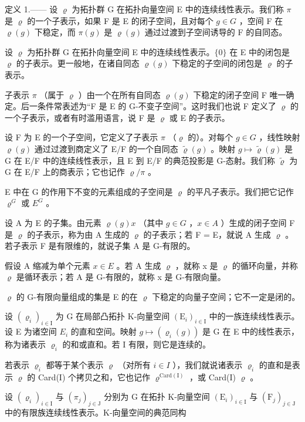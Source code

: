 定义 1.—— 设 \(\varrho\) 为拓扑群 G 在拓扑向量空间 E 中的连续线性表示。我们称 \(\pi\) 是 \(\varrho\) 的一个子表示，如果 F 是 E 的闭子空间，且对每个 \(g \in G\) ，空间 F 在 \(\varrho(g)\) 下稳定，而 \(\pi(g)\) 是 \(\varrho(g)\) 通过过渡到子空间诱导的 F 的自同态。

设 \(\varrho\) 为拓扑群 G 在拓扑向量空间 E 中的连续线性表示。\(\{0\}\) 在 E 中的闭包是 \(\varrho\) 的子表示。更一般地，在诸自同态 \(\varrho(g)\) 下稳定的子空间的闭包是 \(\varrho\) 的子表示。

子表示 \(\pi\) （属于 \(\varrho\) ）由一个在所有自同态 \(\varrho(g)\) 下稳定的闭子空间 F 唯一确定。后一条件常表述为“F 是 E 的 G-不变子空间”。这时我们也说 F 定义了 \(\varrho\) 的一个子表示，或者有时滥用语言，说 F 是 \(\varrho\) 或 E 的子表示。

设 F 为 E 的一个子空间，它定义了子表示 \(\pi\) （\(\varrho\) 的）。对每个 \(g \in G\) ，线性映射 \(\varrho(g)\) 通过过渡到商定义了 E/F 的一个自同态 \(\widetilde{\varrho}(g)\) 。映射 \(g \mapsto \widetilde{\varrho}(g)\) 是 G 在 E/F 中的连续线性表示，且 E 到 E/F 的典范投影是 G-态射。我们称 \(\widetilde{\varrho}\) 为 G 在 E/F 上的商表示；它也记作 \(\varrho/\pi\) 。

E 中在 G 的作用下不变的元素组成的子空间是 \(\varrho\) 的平凡子表示。我们把它记作 \(\varrho^{G}\) 或 \(E^{G}\) 。

设 A 为 E 的子集。由元素 \(\varrho(g)x\) （其中 \(g \in G\) ，\(x \in A\) ）生成的闭子空间 F 是 \(\varrho\) 的子表示，称为由 A 生成的 \(\varrho\) 的子表示；若 F = E，就说 A 生成 \(\varrho\) 。若子表示 F 是有限维的，就说子集 A 是 G-有限的。

假设 A 缩减为单个元素 \(x \in E\) 。若 A 生成 \(\varrho\) ，就称 x 是 \(\varrho\) 的循环向量，并称 \(\varrho\) 是循环表示；若 A 是 G-有限的，就称 x 是 G-有限向量。

\(\varrho\) 的 G-有限向量组成的集是 E 的在 \(\varrho\) 下稳定的向量子空间；它不一定是闭的。

设 \((\varrho_{i})_{i\in\mathrm{I}}\) 为 G 在局部凸拓扑 K-向量空间 \((\mathrm{E}_{i})_{i\in\mathrm{I}}\) 中的一族连续线性表示。设 E 为诸空间 \(E_{i}\) 的直和空间。映射 \(g\mapsto(\varrho_{i}(g))\) 是 G 在 E 中的线性表示，称为诸表示 \(\varrho_{i}\) 的和或直和。若 I 有限，则它是连续的。

若表示 \(\varrho_{i}\) 都等于某个表示 \(\varrho\) （对所有 \(i \in I\) ），我们就说诸表示 \(\varrho_{i}\) 的直和是表示 \(\varrho\) 的 Card(I) 个拷贝之和，它也记作 \(\varrho^{\mathrm{Card(I)}}\) ，或 Card(I) \(\varrho\) 。

设 \((\varrho_{i})_{i\in\mathrm{I}}\) 与 \((\pi_{j})_{j\in\mathrm{J}}\) 分别为 G 在拓扑 K-向量空间 \((\mathrm{E}_{i})_{i\in\mathrm{I}}\) 与 \((\mathrm{F}_{j})_{j\in\mathrm{J}}\) 中的有限族连续线性表示。K-向量空间的典范同构

